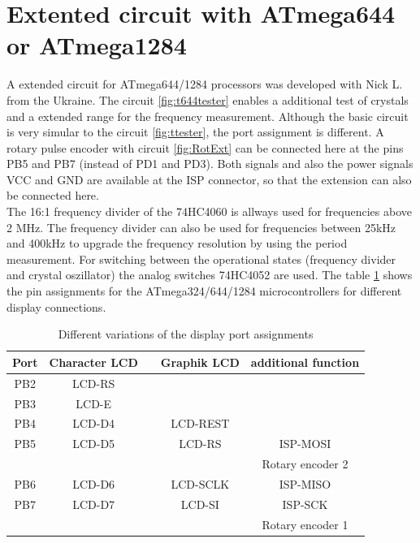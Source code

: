 \section{Extented circuit with ATmega644 or ATmega1284}

A extended circuit for ATmega644/1284 processors was developed with Nick L. from the Ukraine.
The circuit \ref{fig:t644tester} enables a additional test of crystals and a extended range
for the frequency measurement.
Although the basic circuit is very simular to the circuit \ref{fig:ttester}, the
port assignment is different.
A rotary pulse encoder with circuit \ref{fig:RotExt} can be connected here at the pins PB5 and PB7 (instead of PD1 and PD3).
Both signals and also the power signals VCC and GND are available at the ISP connector,
so that the extension can also be connected here.\\

The 16:1 frequency divider of the 74HC4060 is allways used for frequencies above 2 MHz.
The frequency divider can also be used for frequencies between 25kHz and 400kHz to
upgrade the frequency resolution by using the period measurement.
For switching between the operational states (frequency divider and crystal oszillator)
the analog switches 74HC4052 are used.
The table \ref{tab:mega644-display} shows the pin assignments for the ATmega324/644/1284
microcontrollers for different display connections.


\begin{table}[H]
  \begin{center}
    \begin{tabular}{| c || c | c | c | c |}
    \hline
      Port & Character LCD &              & Graphik LCD  & additional function\\
    \hline
    \hline
    PB2    &  LCD-RS         &            &             &       \\
    \hline
    PB3    &  LCD-E          &            &             &       \\
    \hline
    PB4    &  LCD-D4         &            &  LCD-REST   &       \\
    \hline
    PB5    &  LCD-D5         &            &  LCD-RS     & ISP-MOSI \\
           &                 &            &             & Rotary encoder 2 \\
    \hline
    PB6    &  LCD-D6         &            &  LCD-SCLK   & ISP-MISO \\
    \hline
    PB7    &  LCD-D7         &            &  LCD-SI     & ISP-SCK  \\
           &                 &            &             & Rotary encoder 1 \\
    \hline
    \end{tabular}
  \end{center}
  \caption{Different variations of the display port assignments}
  \label{tab:mega644-display}
\end{table}


